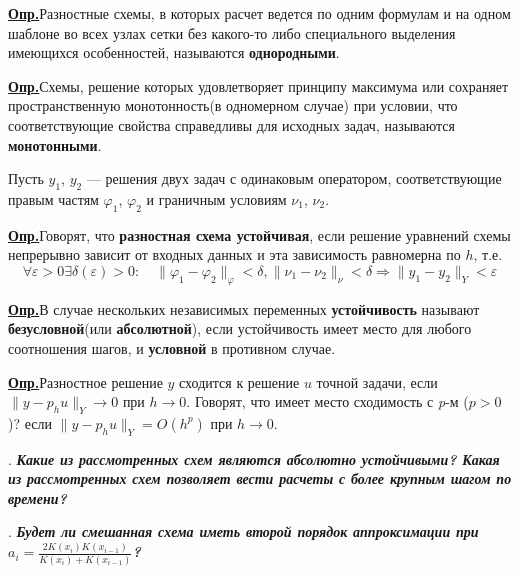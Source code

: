\documentclass[12pt, a4paper]{article}
\newcommand{\opr}{\textbf{\underline{{Опр.}}}\quad}
\renewcommand{\phi}{\varphi}
\newcounter{mycounter}
\newcommand{\quastion}[1]{%
	\stepcounter{mycounter}%
	\textbf{\themycounter}.  %
	\textbf{\textit{#1}}
	
}
\begin{document}
	\opr Разностные схемы, в которых расчет ведется по одним формулам и на одном шаблоне во всех узлах сетки без какого-то либо специального выделения имеющихся особенностей, называются \textbf{однородными}. 
	
	\opr Схемы, решение которых удовлетворяет принципу максимума или сохраняет пространственную монотонность(в одномерном случае) при условии, что соответствующие свойства справедливы для исходных задач, называются \textbf{монотонными}. 
	
	Пусть $y_1$, $y_2$ --- решения двух задач с одинаковым оператором, соответствующие правым частям $\phi_1$, $\phi_2$ и граничным условиям $\nu_1$, $\nu_2$.
	
	\opr Говорят, что \textbf{разностная схема устойчивая}, если решение уравнений схемы непрерывно зависит от входных данных и эта зависимость равномерна по $h$, т.е.
	\begin{equation*}
		\forall \varepsilon > 0 \exists \delta(\varepsilon) > 0: \quad \parallel \phi_1 - \phi_2 \parallel_\phi < \delta,   \parallel \nu_1 - \nu_2 \parallel_\nu <  \delta \Rightarrow \parallel y_1 - y_2 \parallel_Y < \varepsilon
	\end{equation*}	
	
	\opr В случае нескольких независимых переменных \textbf{устойчивость} называют \textbf{безусловной}(или \textbf{абсолютной}), если устойчивость имеет место для любого соотношения шагов, и \textbf{условной} в противном случае.
	
	\opr Разностное решение $y$ сходится к решение $u$ точной задачи, если $\parallel y - p_h u \parallel_Y \to 0$ при $h \to 0$. Говорят, что имеет место сходимость с \textit{p}-м ($p > 0$)? если $\parallel y - p_h u \parallel_Y = O(h^p)$ при $h \to 0$.
	
	
	\clearpage %
	\quastion{Какие из рассмотренных схем являются абсолютно устойчивыми? Какая из рассмотренных схем позволяет вести расчеты с более крупным шагом по времени?}
	
	
	
	\clearpage %
	\quastion{Будет ли смешанная схема иметь второй порядок аппроксимации при $a_i = \frac{2 K(x_i) K(x_{i-1})}{K(x_i) + K(x_{i-1})}$?}
	
\end{document}
